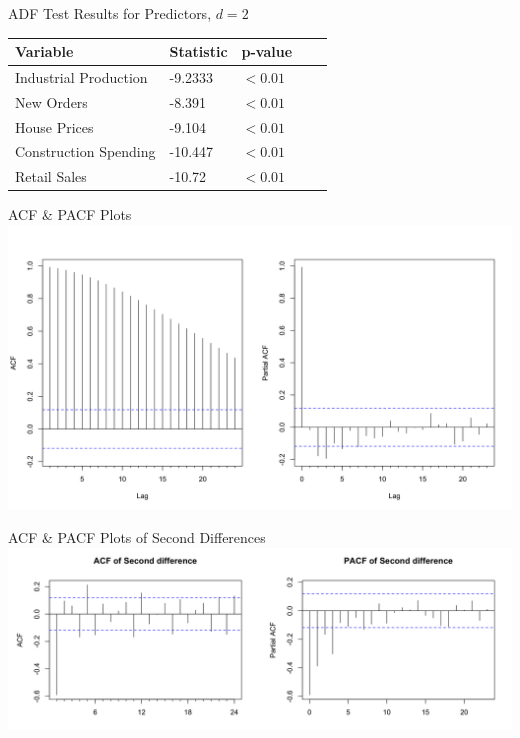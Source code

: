 \documentclass[ignorenonframetext]{beamer}
\begin{document}
  	\begin{frame}{ADF Test Results for Predictors, \(d=2\)}
\begin{table}[htb]
		 \centering
		 \begin{tabular}{lllll}
		 \hline
		 \textbf{Variable} & \textbf{Statistic}  & \textbf{p-value}\\ \hline
		  Industrial Production & -9.2333  &\( < 0.01\)\\
		  New Orders &  -8.391  & \( < 0.01\)\\			  
		  House Prices &  -9.104  & \( < 0.01\)\\				  
		  Construction Spending &  -10.447 &  \( < 0.01\)\\
		  Retail Sales &  -10.72 &  \( < 0.01\)\\ \hline
		 \end{tabular}
		 \end{table}
  	\end{frame}
 
  	\begin{frame}{ACF \& PACF Plots}
     	\includegraphics[width=\linewidth]{images/acfpacf}
  	\end{frame}
  
  	\begin{frame}{ACF \& PACF Plots of Second Differences}
     	\includegraphics[width=\textwidth]{images/acfpacf2d}
  	\end{frame}
  
\end{document}
